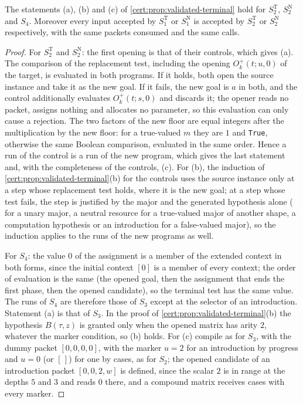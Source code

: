 \begin{proposition}\label{cert:prop:checked-strict}
The statements (a), (b) and (c) of \cref{cert:prop:validated-terminal} hold for
$S^{\mathrm T}_2$, $S^{\mathrm N}_2$ and $S_4$. Moreover every input accepted by
$S^{\mathrm T}_1$ or $S^{\mathrm N}_1$ is accepted by $S^{\mathrm T}_2$ or
$S^{\mathrm N}_2$ respectively, with the same packets consumed and the same calls.
\end{proposition}
\begin{proof}
For $S^{\mathrm T}_2$ and $S^{\mathrm N}_2$: the first opening is that of their
controls, which gives (a). The comparison of the replacement test, including the
opening $O^{+}_k(t;u,0)$ of the target, is evaluated in both programs. If it
holds, both open the source instance and take it as the new goal. If it fails,
the new goal is $a$ in both, and the control additionally evaluates
$O^{+}_k(t;s,0)$ and discards it; the opener reads no packet, assigns nothing
and allocates no parameter, so this evaluation can only cause a rejection. The
two factors of the new floor are equal integers after the multiplication by the
new floor: for a true-valued $m$ they are $1$ and \texttt{True}, otherwise the
same Boolean comparison, evaluated in the same order. Hence a run of the control
is a run of the new program, which gives the last statement and, with the
completeness of the controls, (c). For (b), the induction of
\cref{cert:prop:validated-terminal}(b) for the controls uses the source instance
only at a step whose replacement test holds, where it is the new goal; at a step
whose test fails, the step is justified by the major and the generated hypothesis
alone ( for a unary major, a neutral resource for a true-valued
major of another shape, a computation hypothesis or an introduction for a
false-valued major), so the induction applies
to the runs of the new programs as well.

For $S_4$: the value $0$ of the assignment is a member of the extended context
in both forms, since the initial context $[0]$ is a member of every context;
the order of evaluation is the same (the opened goal, then the assignment that
ends the first phase, then the opened candidate), so the terminal test has the
same value. The runs of $S_4$ are therefore those of $S_3$ except at the selector
of an introduction. Statement (a) is that of $S_3$. In the proof of
\cref{cert:prop:validated-terminal}(b) the hypothesis $B(\tau,z)$ is granted only
when the opened matrix has arity $2$, whatever the marker condition, so (b)
holds. For (c) compile as for $S_3$, with the dummy packet $[0,0,0,0]$, with the
marker $u=2$ for an introduction by progress and $u=0$ (or $[\,]$) for one by
cases, as for $S_2$; the opened candidate of an introduction packet $[0,0,2,w]$ is
defined, since the scalar $2$ is in range at the depths $5$ and $3$ and reads $0$
there, and a compound matrix receives cases with every marker.
\end{proof}

